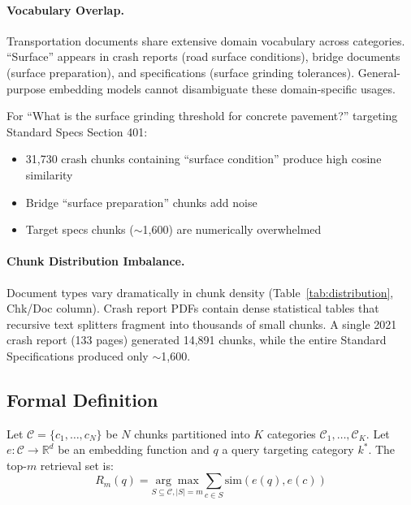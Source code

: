 \documentclass[11pt,a4paper]{article}
\begin{document}
\paragraph{Vocabulary Overlap.} Transportation documents share extensive domain vocabulary across categories. ``Surface'' appears in crash reports (road surface conditions), bridge documents (surface preparation), and specifications (surface grinding tolerances). General-purpose embedding models \cite{reimers2019sentencebert, wang2024e5mistral} cannot disambiguate these domain-specific usages.

For ``What is the surface grinding threshold for concrete pavement?'' targeting Standard Specs Section 401:
\begin{itemize}[leftmargin=*,topsep=2pt,itemsep=1pt]
    \item 31,730 crash chunks containing ``surface condition'' produce high cosine similarity
    \item Bridge ``surface preparation'' chunks add noise
    \item Target specs chunks ($\sim$1,600) are numerically overwhelmed
\end{itemize}

\paragraph{Chunk Distribution Imbalance.} Document types vary dramatically in chunk density (Table~\ref{tab:distribution}, Chk/Doc column). Crash report PDFs contain dense statistical tables that recursive text splitters \cite{langchain2024recursive} fragment into thousands of small chunks. A single 2021 crash report (133 pages) generated 14,891 chunks, while the entire Standard Specifications produced only $\sim$1,600.

\subsection{Formal Definition}

Let $\mathcal{C} = \{c_1, \ldots, c_N\}$ be $N$ chunks partitioned into $K$ categories $\mathcal{C}_1, \ldots, \mathcal{C}_K$. Let $e: \mathcal{C} \rightarrow \mathbb{R}^d$ be an embedding function and $q$ a query targeting category $k^*$. The top-$m$ retrieval set is:
\begin{equation}
R_m(q) = \underset{S \subseteq \mathcal{C}, |S|=m}{\arg\max} \sum_{c \in S} \text{sim}(e(q), e(c))
\end{equation}
\end{document}
